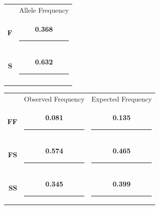 \begin{minipage}{0.3\linewidth}
	\begin{tabular}{rc}
	&	Allele Frequency\\[3ex]
	\Large\textbf{F} & \ifprintanswers\textbf{0.368} \else \rule{3cm}{0.4pt} \fi\\[3ex]
	\Large\textbf{S} & \ifprintanswers\textbf{0.632} \else \rule{3cm}{0.4pt} \fi\\[3ex]
	\Large\null	 & \null\\
	\end{tabular}
\end{minipage}\hfill
\begin{minipage}{0.6\linewidth}
	\begin{tabular}{rcc}
		&	Observed Frequency		&	Expected Frequency\\[3ex]
		\large\textbf{FF} & \ifprintanswers\textbf{0.081} \else \rule{3cm}{0.4pt} \fi & \ifprintanswers\textbf{0.135} \else \rule{3cm}{0.4pt} \fi\\[3ex]
		\large\textbf{FS} & \ifprintanswers\textbf{0.574} \else \rule{3cm}{0.4pt} \fi & \ifprintanswers\textbf{0.465} \else \rule{3cm}{0.4pt} \fi \\[3ex]
		\large\textbf{SS} & \ifprintanswers\textbf{0.345} \else \rule{3cm}{0.4pt} \fi & \ifprintanswers\textbf{0.399} \else \rule{3cm}{0.4pt} \fi \\
	\end{tabular}
\end{minipage}

